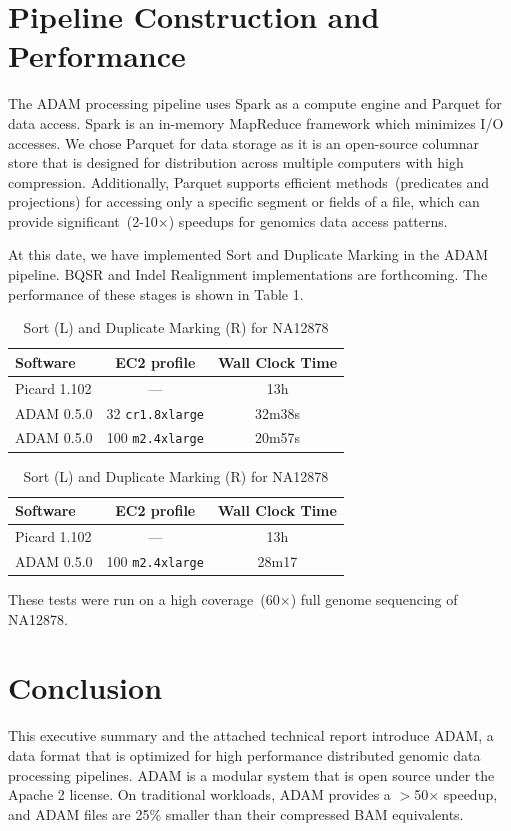 \documentclass[10pt]{article}
\begin{document}
\section{Pipeline Construction and Performance}

The ADAM processing pipeline uses Spark as a compute engine and Parquet for data access. Spark is an in-memory MapReduce framework
which minimizes I/O accesses. We chose Parquet for data storage as it is an open-source columnar store that is designed for distribution across
multiple computers with high compression. Additionally, Parquet supports efficient methods~(predicates and projections) for accessing only a
specific segment or fields of a file, which can provide significant~(2-10$\times$) speedups for genomics data access patterns.

At this date, we have implemented Sort and Duplicate Marking in the ADAM pipeline. BQSR and Indel Realignment implementations are
forthcoming. The performance of these stages is shown in Table 1.

\begin{table}[h]
\small
\caption{Sort (L) and Duplicate Marking (R) for NA12878}
\begin{center}
\begin{tabular}{| l | c | c |}
\hline
\bf Software & \bf EC2 profile & \bf Wall Clock Time \\
\hline
\hline
Picard 1.102 & --- & 13h \\
ADAM 0.5.0 & 32 \texttt{cr1.8xlarge} & 32m38s \\
ADAM 0.5.0 & 100 \texttt{m2.4xlarge} & 20m57s \\ 
\hline
\end{tabular}
\begin{tabular}{| l | c | c |}
\hline
\bf Software & \bf EC2 profile & \bf Wall Clock Time \\
\hline
\hline
Picard 1.102 & --- & 13h \\
ADAM 0.5.0 & 100 \texttt{m2.4xlarge} & 28m17 \\
\hline
\end{tabular}
\end{center}
\end{table}

\noindent These tests were run on a high coverage~(60$\times$) full genome sequencing of NA12878.

\section{Conclusion}

This executive summary and the attached technical report introduce ADAM, a data format that is optimized for high performance
distributed genomic data processing pipelines. ADAM is a modular system that is open source under the Apache 2 license. On
traditional workloads, ADAM provides a $>$50$\times$ speedup, and ADAM files are 25\% smaller than their compressed BAM
equivalents.

\footnotesize




\end{document}
